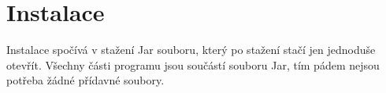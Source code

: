 \section{Instalace}
Instalace spočívá v stažení Jar souboru, který po stažení stačí jen jednoduše otevřít. Všechny části programu jsou součástí souboru Jar, tím pádem nejsou potřeba žádné přídavné soubory.